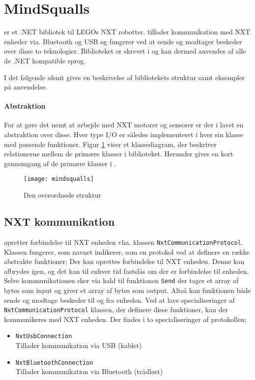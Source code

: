\section{MindSqualls}\label{mindsqualls}
\mindsqualls er et .NET bibliotek til LEGOs NXT robotter.
\mindsqualls tillader kommunikation med NXT enheder via. Bluetooth og USB og fungerer ved at sende og modtager beskeder over disse to teknologier.
Biblioteket er skrevet i \csharp og kan dermed anvendes af alle de .NET kompatible sprog.

I det følgende afsnit gives en beskrivelse af bibliotekets struktur samt eksempler på anvendelse.

\paragraph{Abstraktion}
For at gøre det nemt at arbejde med NXT motorer og sensorer er der i \mindsqualls lavet en abstraktion over disse.
Hver type I/O er således implementeret i hver sin klasse med passende funktioner.
Figur \ref{mindsqualls:structure} viser et klassediagram, der beskriver relationerne mellem de primære klasser i \mindsqualls biblioteket.
Herunder gives en kort gennemgang af de primære klasser i \mindsqualls.

\begin{figure}
\centering
\texttt{[image: mindsqualls]}
\caption{Den overordnede \mindsqualls struktur}
\label{mindsqualls:structure}
\end{figure}

\subsection{NXT kommunikation}
\mindsqualls opretter forbindelse til NXT enheden vha. klassen \lstinline[style=csharp]!NxtCommunicationProtocol!.
Klassen fungerer, som navnet indikerer, som en protokol ved at definere en række abstrakte funktioner;
Der kan oprettes forbindelse til NXT enheden.
Denne kan afbrydes igen, og det kan til enhver tid fastslås om der er forbindelse til enheden.
Selve kommunikationen sker via kald til funktionen \lstinline[style=csharp]!Send! der tager et array af bytes som input og giver et array af bytes som output.
Altså kan funktionen både sende og modtage beskeder til og fra enheden.
Ved at lave specialiseringer af \lstinline[style=csharp]!NxtCommunicationProtocol! klassen, der definere disse funktioner, kan der kommunikeres med NXT enheden.
Der findes i \mindsqualls to specialiseringer af protokollen;
\begin{itemize}
\item \lstinline[style=csharp]!NxtUsbConnection!\\
Tillader kommunikation via USB (kablet)
\item \lstinline[style=csharp]!NxtBluetoothConnection!\\
Tillader kommunikation via Bluetooth (trådløst)
\end{itemize}

